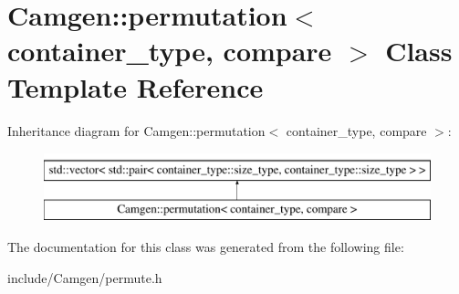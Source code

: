 \hypertarget{a00417}{}\section{Camgen\+:\+:permutation$<$ container\+\_\+type, compare $>$ Class Template Reference}
\label{a00417}
Inheritance diagram for Camgen\+:\+:permutation$<$ container\+\_\+type, compare $>$\+:\begin{figure}[H]
\begin{center}
\leavevmode
\includegraphics[height=2.000000cm]{a00417}
\end{center}
\end{figure}


The documentation for this class was generated from the following file\+:\begin{DoxyCompactItemize}
\item 
include/\+Camgen/permute.\+h\end{DoxyCompactItemize}
